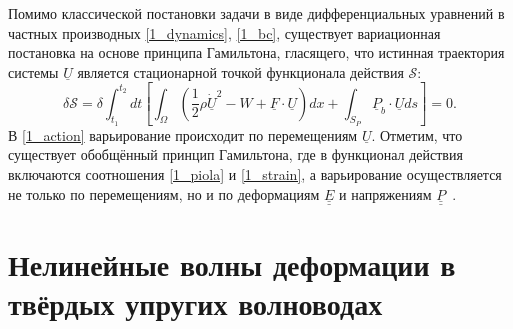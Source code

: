 \documentclass[12pt, a4paper]{report}
\newcommand{\lb}{\left (}
\newcommand{\rb}{\right )}
\newcommand{\lsq}{\left [}
\newcommand{\rsq}{\right ]}
\newcommand{\vect}[1]{\underline{#1}}
\newcommand{\tens}[1]{\underline{\underline{#1}}}
\begin{document}
Помимо классической постановки задачи в виде дифференциальных уравнений в частных производных \eqref{1_dynamics}, \eqref{1_bc}, существует вариационная постановка на основе принципа Гамильтона, гласящего, что истинная траектория системы $\vect{U}$ является стационарной точкой функционала действия $\mathcal{S}$:
\begin{equation}\label{1_action}
\delta\mathcal{S} = \delta\int_{t_1}^{t_2} dt \lsq \int_{\Omega} \lb \frac12\rho\dot{\vect{U}}^2 - W + \vect{F}\cdot\vect{U} \rb dx + \int_{S_P} \vect{P}_b\cdot\vect{U} ds \rsq = 0.
\end{equation}
В \eqref{1_action} варьирование происходит по перемещениям $\vect{U}$. Отметим, что существует обобщённый принцип Гамильтона, где в функционал действия включаются соотношения \eqref{1_piola} и \eqref{1_strain}, а варьирование осуществляется не только по перемещениям, но и по деформациям $\tens{E}$ и напряжениям $\tens{P}$~\cite{Yu}.



\section{Нелинейные волны деформации в твёрдых упругих волноводах}
\end{document}
